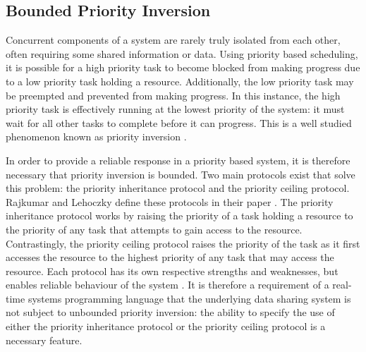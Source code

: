 \subsection{Bounded Priority Inversion}
Concurrent components of a system are rarely truly isolated from each other,
often requiring some shared information or data.
Using priority based scheduling, it is possible for a high priority
task to become blocked from making progress due to a low priority task holding
a resource. Additionally, the low priority task may be preempted and prevented
from making progress. In this instance, the high priority task is effectively
running at the lowest priority of the system: it must wait for all other
tasks to complete before it can progress. This is a well studied phenomenon
known as priority inversion \cite{real-time-systems}.  
\par\bigskip\noindent
In
order to provide a reliable response in a priority based system, it is
therefore necessary that priority inversion is bounded.  Two main protocols
exist that solve this problem: the priority inheritance protocol and the
priority ceiling protocol. Rajkumar and Lehoczky define these protocols in their
paper \cite{57058}. The priority inheritance
protocol works by raising the priority of a task holding a resource to the
priority of any task that attempts to gain access to the resource.
Contrastingly, the priority ceiling protocol raises the priority of the task as
it first accesses the resource to the highest priority of any task that may
access the resource.  Each protocol has its own respective strengths and
weaknesses, but enables reliable behaviour of the system \cite{mall2009real}.
It is therefore a requirement of a real-time systems programming language that
the underlying data sharing system is not subject to unbounded priority
inversion: the ability to specify the use of either the priority inheritance
protocol or the priority ceiling protocol is a necessary feature.  

